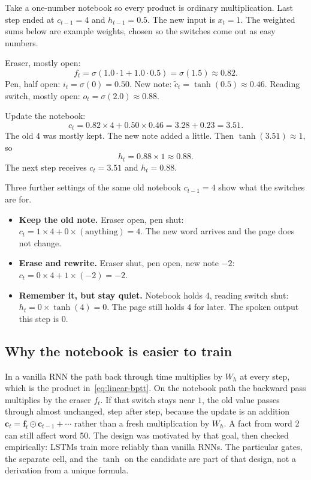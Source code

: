 \documentclass[11pt]{article}
\begin{document}
Take a one-number notebook so every product is ordinary multiplication.
Last step ended at \(c_{t-1}=4\) and \(h_{t-1}=0.5\). The new input is
\(x_t=1\). The weighted sums below are example weights, chosen so the
switches come out as easy numbers.

Eraser, mostly open:
\[
f_t=\sigma(1.0\cdot 1+1.0\cdot 0.5)=\sigma(1.5)\approx 0.82.
\]
Pen, half open: \(i_t=\sigma(0)=0.50\).
New note: \(\tilde{c}_t=\tanh(0.5)\approx 0.46\).
Reading switch, mostly open: \(o_t=\sigma(2.0)\approx 0.88\).

Update the notebook:
\[
c_t=0.82\times 4+0.50\times 0.46=3.28+0.23=3.51.
\]
The old \(4\) was mostly kept. The new note added a little. Then
\(\tanh(3.51)\approx 1\), so
\[
h_t=0.88\times 1\approx 0.88.
\]
The next step receives \(c_t=3.51\) and \(h_t=0.88\).

Three further settings of the same old notebook \(c_{t-1}=4\) show what the
switches are for.
\begin{itemize}[leftmargin=*]
  \item \textbf{Keep the old note.} Eraser open, pen shut:
        \(c_t=1\times 4+0\times(\text{anything})=4\). The new word arrives
        and the page does not change.
  \item \textbf{Erase and rewrite.} Eraser shut, pen open, new note \(-2\):
        \(c_t=0\times 4+1\times(-2)=-2\).
  \item \textbf{Remember it, but stay quiet.} Notebook holds \(4\), reading
        switch shut: \(h_t=0\times\tanh(4)=0\). The page still holds \(4\)
        for later. The spoken output this step is \(0\).
\end{itemize}

\subsection{Why the notebook is easier to train}

In a vanilla RNN the path back through time multiplies by \(W_h\) at every
step, which is the product in~\eqref{eq:linear-bptt}. On the notebook path
the backward pass multiplies by the eraser \(f_t\). If that switch stays
near \(1\), the old value passes through almost unchanged, step after step,
because the update is an addition
\(\mathbf{c}_t=\mathbf{f}_t\odot\mathbf{c}_{t-1}+\cdots\) rather than a
fresh multiplication by \(W_h\). A fact from word 2 can still affect word
50. The design was motivated by that goal, then checked empirically: LSTMs
train more reliably than vanilla RNNs. The particular gates, the separate
cell, and the \(\tanh\) on the candidate are part of that design, not a
derivation from a unique formula.
\end{document}
